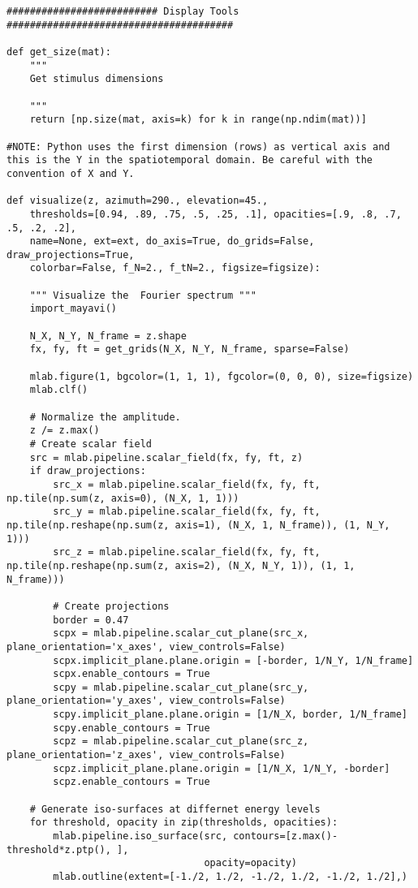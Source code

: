 \documentclass[a4paper,11pt]{article}%
\begin{document}
\begin{lstlisting}
########################## Display Tools #######################################

def get_size(mat):
    """ 
    Get stimulus dimensions 

    """
    return [np.size(mat, axis=k) for k in range(np.ndim(mat))]

#NOTE: Python uses the first dimension (rows) as vertical axis and this is the Y in the spatiotemporal domain. Be careful with the convention of X and Y.

def visualize(z, azimuth=290., elevation=45.,
    thresholds=[0.94, .89, .75, .5, .25, .1], opacities=[.9, .8, .7, .5, .2, .2],
    name=None, ext=ext, do_axis=True, do_grids=False, draw_projections=True,
    colorbar=False, f_N=2., f_tN=2., figsize=figsize):

    """ Visualize the  Fourier spectrum """
    import_mayavi()

    N_X, N_Y, N_frame = z.shape
    fx, fy, ft = get_grids(N_X, N_Y, N_frame, sparse=False)

    mlab.figure(1, bgcolor=(1, 1, 1), fgcolor=(0, 0, 0), size=figsize)
    mlab.clf()

    # Normalize the amplitude.
    z /= z.max()
    # Create scalar field
    src = mlab.pipeline.scalar_field(fx, fy, ft, z)
    if draw_projections:
        src_x = mlab.pipeline.scalar_field(fx, fy, ft, np.tile(np.sum(z, axis=0), (N_X, 1, 1)))
        src_y = mlab.pipeline.scalar_field(fx, fy, ft, np.tile(np.reshape(np.sum(z, axis=1), (N_X, 1, N_frame)), (1, N_Y, 1)))
        src_z = mlab.pipeline.scalar_field(fx, fy, ft, np.tile(np.reshape(np.sum(z, axis=2), (N_X, N_Y, 1)), (1, 1, N_frame)))

        # Create projections
        border = 0.47
        scpx = mlab.pipeline.scalar_cut_plane(src_x, plane_orientation='x_axes', view_controls=False)
        scpx.implicit_plane.plane.origin = [-border, 1/N_Y, 1/N_frame]
        scpx.enable_contours = True
        scpy = mlab.pipeline.scalar_cut_plane(src_y, plane_orientation='y_axes', view_controls=False)
        scpy.implicit_plane.plane.origin = [1/N_X, border, 1/N_frame]
        scpy.enable_contours = True
        scpz = mlab.pipeline.scalar_cut_plane(src_z, plane_orientation='z_axes', view_controls=False)
        scpz.implicit_plane.plane.origin = [1/N_X, 1/N_Y, -border]
        scpz.enable_contours = True

    # Generate iso-surfaces at differnet energy levels
    for threshold, opacity in zip(thresholds, opacities):
        mlab.pipeline.iso_surface(src, contours=[z.max()-threshold*z.ptp(), ],
                                  opacity=opacity)
        mlab.outline(extent=[-1./2, 1./2, -1./2, 1./2, -1./2, 1./2],)


\end{lstlisting}
\end{document}
